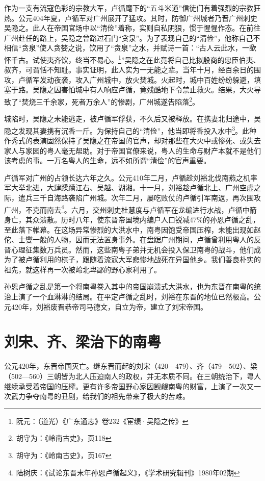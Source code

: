 作为一支有流寇色彩的宗教大军，卢循麾下的“五斗米道”信徒们有着强烈的宗教狂热。公元404年夏，卢循军对广州展开了猛攻。其时，防御广州城者乃晋广州刺史吴隐之。此人在帝国官场中以“清俭”着称，实则自私阴狠，惯于惺惺作态。在前往广州赴任的路上，吴隐之曾路过石门“贪泉”。为了表现自己的“清俭”，他称自己不相信“贪泉”使人贪婪之说，饮用了“贪泉”之水，并赋诗一首：“古人云此水，一歃怀千古。试使夷齐饮，终当不易心。\footnote{阮元：（道光）《广东通志》卷232《宦绩·吴隐之传》}”吴隐之在此竟将自己比拟殷商的忠臣伯夷、叔齐，可谓恬不知耻。事实证明，此人实为一无能之辈。当年十月，经百余日的围攻，卢循军发动夜袭，攻入广州城中，放火焚城。火起时，城中百姓纷纷躲避，填塞于路。吴隐之因害怕城中有人响应卢循，竟残酷地下令禁止救火。结果，大火导致了“焚烧三千余家，死者万余人”的惨剧，广州城遂告陷落\footnote{胡守为：《岭南古史》，页118}。

城陷时，吴隐之未能逃走，被卢循军俘获，不久后又被释放。在携妻北归途中，吴隐之发现其妻携有沉香一斤。为保持自己的“清俭”，他当即将香投入水中\footnote{胡守为：《岭南古史》，页167}。此种作秀式的表演固然保持了吴隐之在帝国的官声，却对那些在大火中或惨死、或失去家人与家园的粤人毫无帮助。对于帝国官僚来说，粤人的生命与财产本就不是他们该考虑的事。一万名粤人的生命，远不如所谓“清俭”的官声重要。

卢循军对广州的占领长达六年之久。公元410年二月，卢循趁刘裕北伐南燕之机率军大举北进，大肆蹂躏江右、吴越、湖湘。十一月，刘裕趁卢循北上、广州空虚之际，遣兵三千自海路袭陷广州城。次年二月，屡吃败仗的卢循引军南返，再次围攻广州，不克而南去\footnote{陆树庆：《试论东晋末年孙恩卢循起义》，《学术研究辑刊》1980年02期}。六月，交州刺史杜慧度与卢循军在龙编进行水战，卢循中箭身亡，其众溃散。历时八年，使东晋帝国境内编户人口锐减47\%的孙恩卢循之乱，至此落下帷幕。在这场异常惨烈的大洪水中，南粤因饱受帝国压榨，未能出现如赵佗、士燮一般的人物，因而无法置身事外。在盘踞广州期间，卢循曾利用粤人的反晋心理征集数万兵员。然而，这些南粤子弟并无机会投入保卫南粤的战斗，他们成为了被卢循利用的棋子，跟随着流寇大军悲惨地战死在异国他乡。我们善良朴实的祖先，就这样再一次被岭北卑鄙的野心家利用了。

孙恩卢循之乱是第一个将南粤卷入其中的帝国崩溃式大洪水，也为东晋在南粤的统治上演了一个血淋淋的结局。在平定卢循之乱时，刘裕在东晋的地位已然极高。公元420年，刘裕废晋恭帝司马德文，自立为帝，建立了刘宋帝国。

\section{刘宋、齐、梁治下的南粤}

\indent 公元420年，东晋帝国灭亡。继东晋而起的刘宋（420—479）、齐（479—502）、梁（502—560）三朝皆为北人压迫南人的政权，并无本质不同。在三朝统治下，粤人继续承受着帝国的压榨。更有许多帝国野心家因觊觎南粤的财富，上演了一次又一次武力争夺南粤的丑剧，给我们的祖先带来了极大的苦难。

